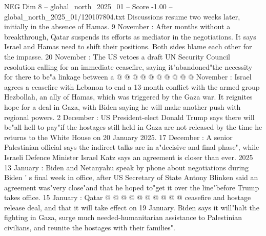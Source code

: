 \begin{textsample}{NEG Dim 8 – global\_north\_2025\_01 – Score -1.00 – global\_north\_2025\_01/120107804.txt}
Discussions resume two weeks later, initially in the absence of Hamas. 9 November : After months without a breakthrough, Qatar suspends its efforts as mediator in the negotiations.
It says Israel and Hamas need to shift their positions.
Both sides blame each other for the impasse. 20 November : The US vetoes a draft UN Security Council resolution calling for an immediate ceasefire, saying it"abandoned"the necessity for there to be"a linkage between a @ @ @ @ @ @ @ @ @ @ November : Israel agrees a ceasefire with Lebanon to end a 13-month conflict with the armed group Hezbollah, an ally of Hamas, which was triggered by the Gaza war.
It reignites hope for a deal in Gaza, with Biden saying he will make another push with regional powers. 2 December : US President-elect Donald Trump says there will be"all hell to pay"if the hostages still held in Gaza are not released by the time he returns to the White House on 20 January 2025. 17 December : A senior Palestinian official says the indirect talks are in a"decisive and final phase", while Israeli Defence Minister Israel Katz says an agreement is closer than ever. 2025 13 January : Biden and Netanyahu speak by phone about negotiations during Biden ' s final week in office, after US Secretary of State Antony Blinken said an agreement was"very close"and that he hoped to"get it over the line"before Trump takes office. 15 January : Qatar @ @ @ @ @ @ @ @ @ @ ceasefire and hostage release deal, and that it will take effect on 19 January.
Biden says it will"halt the fighting in Gaza, surge much needed-humanitarian assistance to Palestinian civilians, and reunite the hostages with their families".

\end{textsample}
